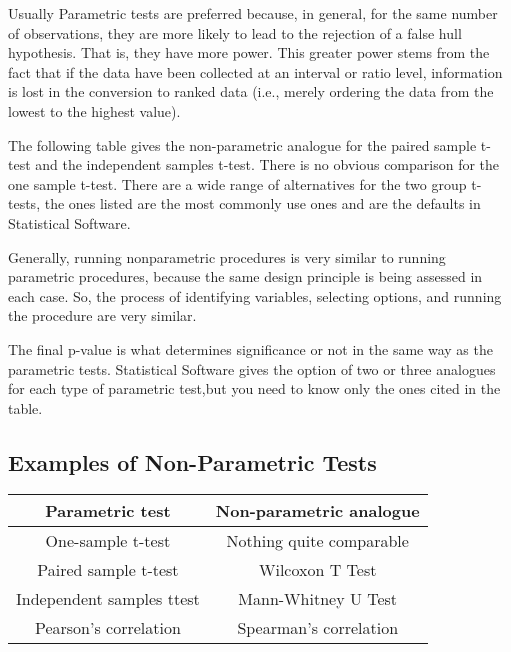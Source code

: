 \documentclass[12pt, a4paper]{report}
\theoremstyle{plain}
\theoremstyle{definition}
\theoremstyle{remark}
\begin{document}
Usually Parametric tests are preferred because, in general, for the same number of observations, they are
more likely to lead to the rejection of a false hull hypothesis. That is, they have more power. This
greater power stems from the fact that if the data have been collected at an interval or ratio level,
information is lost in the conversion to ranked data (i.e., merely ordering the data from the lowest to the highest value).

The following table gives the non-parametric analogue for the paired sample t-test and the
independent samples t-test. There is no obvious comparison for the one sample t-test.
There are a wide range of alternatives for the two group t-tests, the ones listed are the most
commonly use ones and are the defaults in Statistical Software. 

Generally, running nonparametric procedures is very similar to running parametric procedures, because the same design principle is being assessed in each case. So, the process of identifying variables, selecting options, and running the procedure are very similar. 

The final p-value is what determines significance or not in the same way as the parametric tests. Statistical Software gives the option of two or three analogues for each type of parametric test,but you need to know only the ones cited in the table.
\newpage
\subsection*{Examples of Non-Parametric Tests}

\begin{center}
\begin{tabular}{|c|c|}
	\hline
\textbf{Parametric test} &  \textbf{Non-parametric analogue} \\ \hline\hline

One-sample t-test    &  Nothing quite comparable \\ \hline
Paired sample t-test & Wilcoxon T Test \\ \hline
Independent samples ttest & Mann-Whitney U Test \\ \hline
Pearson's correlation & Spearman's correlation  \\ \hline
\end{tabular} 
\end{center}
\end{document}
